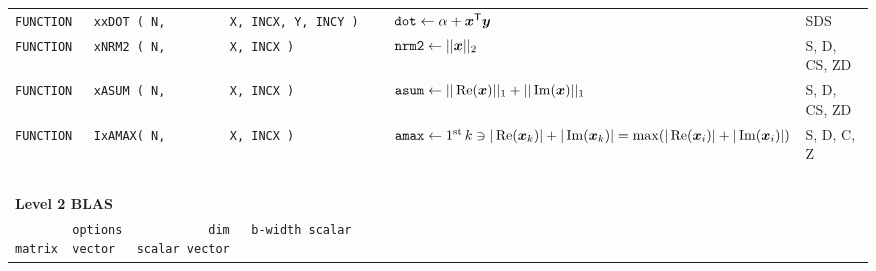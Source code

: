 \documentclass[10pt,a3paper, landscape]{article}
\newcommand{\T}{\mathsf{T}}
\begin{document}
\begin{tabular}{ll>{\ttfamily}l}
		\verb|FUNCTION   xxDOT ( N,         X, INCX, Y, INCY )                                         | & $\texttt{dot} \gets \alpha + \vb*{x}^{\T} \vb*{y}$                                                                                                                                                                                                           & SDS                \\
		\verb|FUNCTION   xNRM2 ( N,         X, INCX )                                                  | & $\texttt{nrm2} \gets ||\vb*{x}||_2$                                                                                                                                                                                                                          & S, D, CS, ZD       \\
		\verb|FUNCTION   xASUM ( N,         X, INCX )                                                  | & $\texttt{asum} \gets ||\Re(\vb*{x})||_1 + ||\Im(\vb*{x})||_1$                                                                                                                                                                                                & S, D, CS, ZD       \\
		\verb|FUNCTION   IxAMAX( N,         X, INCX )                                                  | & $\texttt{amax} \gets \text{1\textsuperscript{st}\,} k \ni |\Re(\vb*{x}_k)| + |\Im(\vb*{x}_k)| = \max(|\Re(\vb*{x}_i)| + |\Im(\vb*{x}_i)|) $                                                                                                                  & S, D, C, Z         \\
		\verb|                                                                                         | &                                                                                                                                                                                                                                                              &                    \\
		\multicolumn{3}{l}{\Large{\textbf{Level 2 BLAS}}}                                                                                                                                                                                                                                                                                                                                    \\
		\verb|        options            dim   b-width scalar matrix  vector   scalar vector           | &                                                                                                                                                                                                                                                              &                    \\

\end{tabular}
\end{document}
